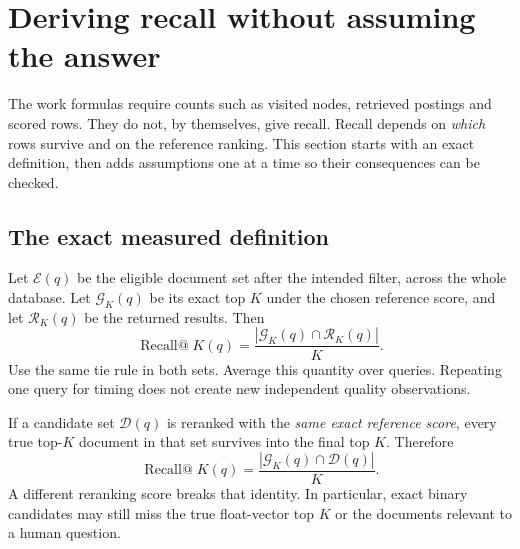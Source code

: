 \section{Deriving recall without assuming the answer}
\label{sec:recall}
The work formulas require counts such as visited nodes, retrieved postings and scored rows.
They do not, by themselves, give recall. Recall depends on \emph{which} rows survive and on the
reference ranking. This section starts with an exact definition, then adds assumptions one at
a time so their consequences can be checked.

\subsection{The exact measured definition}
Let $\mathcal E(q)$ be the eligible document set after the intended filter, across the whole
database. Let $\mathcal G_K(q)$ be its exact top $K$ under the chosen reference score, and let
$\mathcal R_K(q)$ be the returned results. Then
\begin{equation}
\operatorname{Recall@}K(q)=
\frac{|\mathcal G_K(q)\cap\mathcal R_K(q)|}{K}.
\label{eq:recall-exact}
\end{equation}
Use the same tie rule in both sets. Average this quantity over queries. Repeating one query
for timing does not create new independent quality observations.

If a candidate set $\mathcal D(q)$ is reranked with the \emph{same exact reference score}, every
true top-$K$ document in that set survives into the final top $K$. Therefore
\begin{equation}
\operatorname{Recall@}K(q)=\frac{|\mathcal G_K(q)\cap\mathcal D(q)|}{K}.
\label{eq:candidate-recall}
\end{equation}
A different reranking score breaks that identity. In particular, exact binary candidates may
still miss the true float-vector top $K$ or the documents relevant to a human question.

